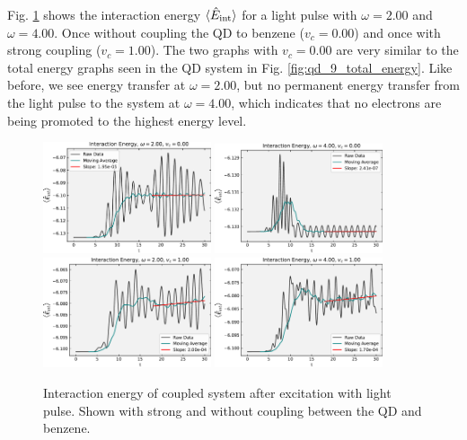 Fig. \ref{fig:interaction_energy_omega} shows the interaction energy $\braket{\hat{E}_{\text{int}}}$ for a light pulse with $\omega = 2.00$ and $\omega=4.00$. Once without coupling the QD to benzene ($v_c=0.00$) and once with strong coupling ($v_c=1.00$). The two graphs with $v_c=0.00$ are very similar to the total energy graphs seen in the QD system in Fig. \ref{fig:qd_9_total_energy}. Like before, we see energy transfer at $\omega = 2.00$, but no permanent energy transfer from the light pulse to the system at $\omega = 4.00$, which indicates that no electrons are being promoted to the highest energy level.
\medskip


\begin{figure}[!hbt]
    \centering
    \includegraphics[width=0.44\textwidth]{graph/potential_energy/Epot_w2_vc0.pdf}
    \includegraphics[width=0.44\textwidth]{graph/potential_energy/Epot_w4_vc0.pdf}
    \includegraphics[width=0.44\textwidth]{graph/potential_energy/Epot_w2_vc1.pdf}
    \includegraphics[width=0.44\textwidth]{graph/potential_energy/Epot_w4_vc1.pdf}
    \caption{Interaction energy of coupled system after excitation with light pulse. Shown with strong and without coupling between the QD and benzene.}
    \label{fig:interaction_energy_omega}
\end{figure}
